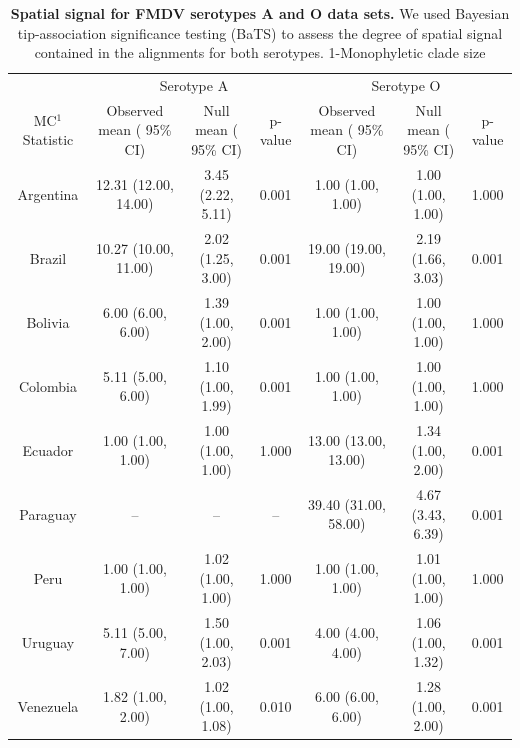\documentclass[a4paper,10pt]{article}
\begin{document}
\begin{table}
\caption{
\textbf{Spatial signal for FMDV serotypes A and O data sets.} We used Bayesian tip-association significance testing (BaTS) to assess the degree of spatial signal contained in the alignments for both serotypes. 1-Monophyletic clade size}
\begin{tabular}{ccccccc}
\toprule
&\multicolumn{3}{c}{Serotype A} & \multicolumn{3}{c}{Serotype O} \\
MC$^1$ Statistic &Observed mean ( 95\% CI)&Null mean ( 95\% CI)&p-value &Observed mean ( 95\% CI)&Null mean ( 95\% CI)&p-value\\
\midrule
Argentina &12.31 (12.00, 14.00)	&3.45	(2.22, 5.11)	&0.001& 1.00 (1.00, 1.00)&	1.00 (1.00, 1.00)&	1.000\\
Brazil &10.27	(10.00, 11.00)	&2.02 (1.25, 3.00) &0.001& 19.00 (19.00, 19.00)&	2.19 (1.66, 3.03)&	0.001\\
Bolivia &6.00 (6.00, 6.00)	&1.39 (1.00, 2.00)	&0.001&1.00 (1.00, 1.00)&	1.00 (1.00, 1.00)&	1.000\\
Colombia &5.11 (5.00, 6.00)	&1.10  (1.00, 1.99)	&0.001&1.00 (1.00, 1.00)&	1.00 (1.00, 1.00)&	1.000\\
Ecuador &1.00 (1.00, 1.00)	&1.00 (1.00, 1.00)	&1.000&13.00 (13.00, 13.00)&	1.34 (1.00, 2.00)&	0.001\\
Paraguay&-- &-- &--  & 39.40 (31.00, 58.00)& 4.67 (3.43, 6.39)&0.001\\
Peru&1.00 (1.00, 1.00)	&1.02 (1.00, 1.00)&1.000&1.00 (1.00, 1.00)&1.01 (1.00, 1.00)&1.000\\
Uruguay &5.11 (5.00, 7.00)	&1.50	(1.00, 2.03)	&0.001&4.00 (4.00, 4.00)&	1.06 (1.00, 1.32)&	0.001\\
Venezuela&1.82 (1.00, 2.00)	&1.02 (1.00, 1.08)	&0.010&6.00 (6.00, 6.00)&	1.28 (1.00, 2.00)&	0.001\\
\bottomrule
\end{tabular}
\begin{flushleft}
\end{flushleft}
\label{tab:BaTS}
\end{table}
\end{document}
